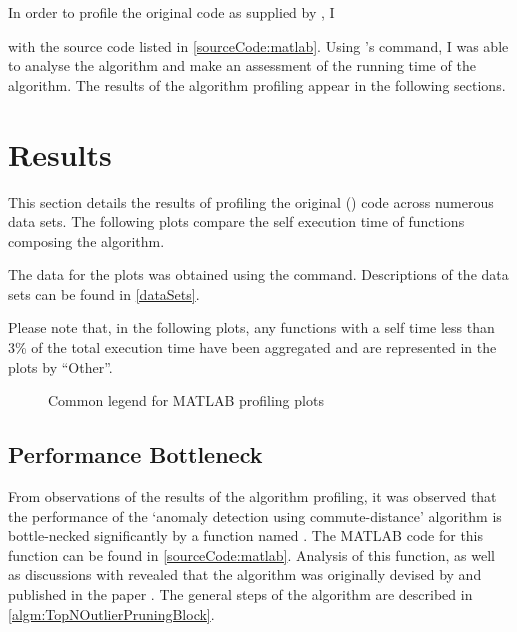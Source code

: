 In order to profile the original  code as supplied by
, I

  with the source code listed in
\autoref{sourceCode:matlab}. Using 's 
command, I was able to analyse the algorithm and make an assessment of the
running time of the algorithm. The results of the algorithm profiling appear in
the following sections.


\section{Results}
\label{software:algorithmProfiling:matlab:results}
This section details the results of profiling the original ()
code across numerous data sets. The following plots compare the self execution
time of functions composing the  algorithm.

The data for the plots was obtained using the 
 command. Descriptions of the data sets can be found in
\autoref{dataSets}.

Please note that, in the following plots, any functions with a self time less
than 3\% of the total execution time have been aggregated and are represented in
the plots by ``Other''.

\begin{figure}
    \centering
    
    \caption{Common legend for MATLAB profiling plots}
    \label{profiling:matlab:legend}
\end{figure}


\subsection{Performance Bottleneck}
\label{algorithmPerformance:bottleneck}
From observations of the results of the algorithm profiling, it was observed
that the performance of the `anomaly detection using commute-distance' algorithm
is bottle-necked significantly by a function named
. The MATLAB code for this function can be
found in \autoref{sourceCode:matlab}. Analysis of this function, as well as
discussions with \citeauthor{Khoa:2012} revealed that the algorithm was
originally devised by \citeauthor{Bay:2003} and published in the paper
. The general steps of the algorithm are described in
\autoref{algm:TopNOutlierPruningBlock}.

